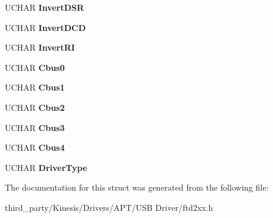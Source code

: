 \begin{DoxyCompactItemize}
\item 
U\+C\+H\+AR {\bfseries Invert\+D\+SR}\hypertarget{structft__eeprom__232r_af9f2706ecbe6182d52bce8d237cc9162}{}\label{structft__eeprom__232r_af9f2706ecbe6182d52bce8d237cc9162}

\item 
U\+C\+H\+AR {\bfseries Invert\+D\+CD}\hypertarget{structft__eeprom__232r_a5ed1bcd1082728d070876c21c167743e}{}\label{structft__eeprom__232r_a5ed1bcd1082728d070876c21c167743e}

\item 
U\+C\+H\+AR {\bfseries Invert\+RI}\hypertarget{structft__eeprom__232r_a1f9d1fbebcbc86c8a27d2abf6b9169f7}{}\label{structft__eeprom__232r_a1f9d1fbebcbc86c8a27d2abf6b9169f7}

\item 
U\+C\+H\+AR {\bfseries Cbus0}\hypertarget{structft__eeprom__232r_a1d81e0319e53a72bd067a3de6387f4d8}{}\label{structft__eeprom__232r_a1d81e0319e53a72bd067a3de6387f4d8}

\item 
U\+C\+H\+AR {\bfseries Cbus1}\hypertarget{structft__eeprom__232r_aa0ed7fa40a23e6e17359c1fec9dc2677}{}\label{structft__eeprom__232r_aa0ed7fa40a23e6e17359c1fec9dc2677}

\item 
U\+C\+H\+AR {\bfseries Cbus2}\hypertarget{structft__eeprom__232r_a697c610b8e23ae556274c34703fd0582}{}\label{structft__eeprom__232r_a697c610b8e23ae556274c34703fd0582}

\item 
U\+C\+H\+AR {\bfseries Cbus3}\hypertarget{structft__eeprom__232r_af6c591aa67f0e9ff287da8af81f7399e}{}\label{structft__eeprom__232r_af6c591aa67f0e9ff287da8af81f7399e}

\item 
U\+C\+H\+AR {\bfseries Cbus4}\hypertarget{structft__eeprom__232r_a390714a332684ea05618238e7388773f}{}\label{structft__eeprom__232r_a390714a332684ea05618238e7388773f}

\item 
U\+C\+H\+AR {\bfseries Driver\+Type}\hypertarget{structft__eeprom__232r_a43812e19d6119e277b91f10e8db8b651}{}\label{structft__eeprom__232r_a43812e19d6119e277b91f10e8db8b651}

\end{DoxyCompactItemize}


The documentation for this struct was generated from the following file\+:\begin{DoxyCompactItemize}
\item 
third\+\_\+party/\+Kinesis/\+Drivers/\+A\+P\+T/\+U\+S\+B Driver/ftd2xx.\+h\end{DoxyCompactItemize}
